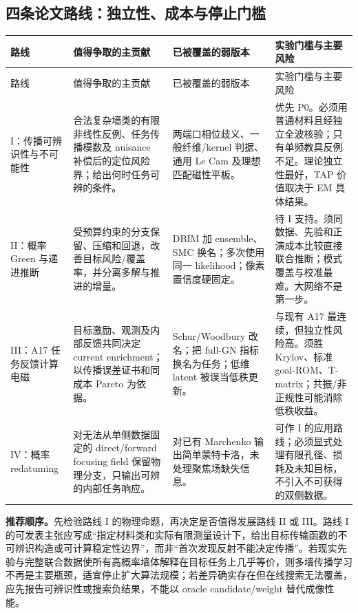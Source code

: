 \subsection{四条论文路线：独立性、成本与停止门槛}

\begingroup
\small
\setlength{\tabcolsep}{4pt}
\begin{longtable}{p{2.0cm}p{4.25cm}p{4.05cm}p{3.7cm}}
\hline
路线 & 值得争取的主贡献 & 已被覆盖的弱版本 & 实验门槛与主要风险 \\
\hline
\endfirsthead
\hline
路线 & 值得争取的主贡献 & 已被覆盖的弱版本 & 实验门槛与主要风险 \\
\hline
\endhead
I：传播可辨识性与不可能性 & 合法复杂墙类的有限非线性反例、任务传播模数及 nuisance 补偿后的定位风险界；给出何时任务可辨的条件。 & 两端口相位歧义、一般纤维/kernel 判据、通用 Le Cam 及理想匹配磁性平板。 & 优先 P0。必须用普通材料且经独立全波核验；只有单频教具反例不足。理论独立性最好，TAP 价值取决于 EM 具体结果。 \\
\hline
II：概率 Green 与递进推断 & 受预算约束的分支保留、压缩和回退，改善目标风险/覆盖率，并分离多解与推进的增量。 & DBIM 加 ensemble、SMC 换名；多次使用同一 likelihood；像素置信度硬固定。 & 待 I 支持。须同数据、先验和正演成本比较直接联合推断；模式覆盖与校准最难。大网络不是第一步。 \\
\hline
III：A17 任务反馈计算电磁 & 目标激励、观测及内部反馈共同决定 current enrichment；以传播误差证书和同成本 Pareto 为依据。 & Schur/Woodbury 改名；把 full-GN 指标换名为任务；低维 latent 被误当低秩更新。 & 与现有 A17 最连续，但独立性风险高。须胜 Krylov、标准 goal-ROM、T-matrix；共振/非正规性可能消除低秩收益。 \\
\hline
IV：概率 redatuming & 对无法从单侧数据固定的 direct/forward focusing field 保留物理分支，只输出可辨的内部任务响应。 & 对已有 Marchenko 输出简单蒙特卡洛，未处理聚焦场缺失信息。 & 可作 I 的应用路线；必须显式处理有限孔径、损耗及未知目标，不引入不可获得的双侧数据。 \\
\hline
\end{longtable}
\endgroup

\textbf{推荐顺序。}先检验路线 I 的物理命题，再决定是否值得发展路线 II 或 III。路线 I 的可发表主张应写成“指定材料类和实际有限测量设计下，给出目标传输函数的不可辨识构造或可计算稳定性边界”，而非“首次发现反射不能决定传播”。若现实先验与完整联合数据使所有高概率墙体解释在目标任务上几乎等价，则多墙传播学习不再是主要瓶颈，适宜停止扩大算法规模；若差异确实存在但在线搜索无法覆盖，应先报告可辨识性或搜索负结果，不能以 oracle candidate/weight 替代成像性能。
